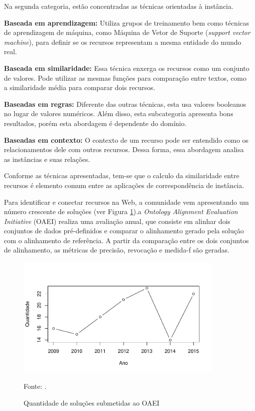 Na segunda categoria, estão concentradas as técnicas orientadas à instância. 

\textbf{Baseada em aprendizagem:} Utiliza grupos de treinamento bem como técnicas de aprendizagem de máquina, como Máquina de Vetor de Suporte (\textit{support vector machine}), para definir se os recursos representam a mesma entidade do mundo real.

\textbf{Baseada em similaridade:} Essa técnica enxerga os recursos como um conjunto de valores. Pode utilizar as mesmas funções para comparação entre textos, como a similaridade média para comparar dois recursos. 

\textbf{Baseadas em regras:} Diferente das outras técnicas, esta usa valores booleanos no lugar de valores numéricos. Além disso, esta subcategoria apresenta bons resultados, porém esta abordagem é dependente do domínio. 

\textbf{Baseadas em contexto:} O contexto de um recurso pode ser entendido como os relacionamentos dele com outros recursos. Dessa forma, essa abordagem analisa as instâncias e suas relações.

Conforme as técnicas apresentadas, tem-se que o calculo da similaridade entre recursos é elemento comum entre as aplicações de correspondência de instância.

Para identificar e conectar recursos na Web, a comunidade vem apresentando um número crescente de soluções (ver Figura \ref{fig:oaei_imtools}).a \textit{Ontology Alignment Evaluation Initiative} (OAEI) realiza uma avaliação anual, que consiste em alinhar dois conjuntos de dados pré-definidos e comparar o alinhamento gerado pela solução com o alinhamento de referência. A partir da comparação entre os dois conjuntos de alinhamento, as métricas de precisão, revocação e medida-f são geradas.


\begin{figure}[!h]
        \centering
        \includegraphics[width=0.9\textwidth]{./imagens/im_tools.pdf}
    \caption{Quantidade de soluções submetidas ao OAEI}
        \footnotesize{Fonte: \cite{cheatham2015results}.}
        \label{fig:oaei_imtools}
\end{figure}

